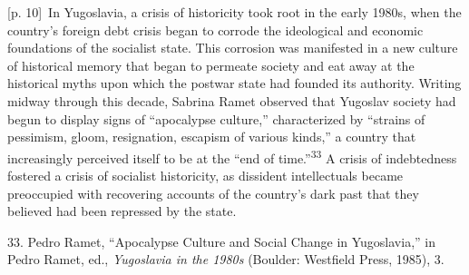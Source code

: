 \documentclass[10pt,a4paper]{article}
\begin{document}
{\scriptsize\color{gray} [p. 10]}\ In Yugoslavia, a crisis of historicity took root in the early 1980s, when the country’s foreign debt crisis began to corrode the ideological and economic foundations of the socialist state. This corrosion was manifested in a new culture of historical memory that began to permeate society and eat away at the historical myths upon which the postwar state had founded its authority. Writing midway through this decade, Sabrina Ramet observed that Yugoslav society had begun to display signs of “apocalypse culture,” characterized by “strains of pessimism, gloom, resignation, escapism of various kinds,” a country that increasingly perceived itself to be at the “end of time.”\nobreak\textsuperscript{33} A crisis of indebtedness fostered a crisis of socialist historicity, as dissident intellectuals became preoccupied with recovering accounts of the country’s dark past that they believed had been repressed by the state.\par{\small 33. Pedro Ramet, “Apocalypse Culture and Social Change in Yugoslavia,” in Pedro Ramet, ed., \textit{Yugoslavia in the 1980s} (Boulder: Westfield Press, 1985), 3.\par}
\end{document}
